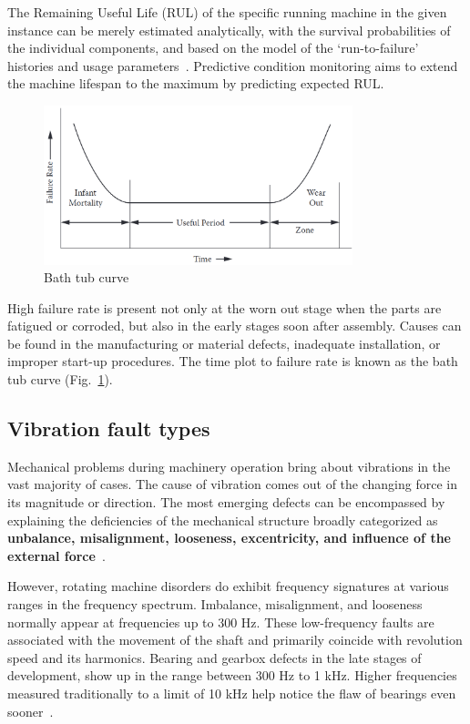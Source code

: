 The Remaining Useful Life (RUL) of the specific running machine in the given instance can be merely estimated analytically, with the survival probabilities of the individual components, and based on the model of the `run-to-failure' histories and usage parameters~\cite{okoh_overview_2014}. Predictive condition monitoring aims to extend the machine lifespan to the maximum by predicting expected RUL.

\begin{figure}[h]
	\centering
	\includegraphics[width=0.8\textwidth]{assets/bath-tub-curve.png}
	\caption{Bath tub curve~\cite{mohanty_machinery_2015}}
	\label{fig:bath-tub-curve}
\end{figure}

High failure rate is present not only at the worn out stage when the parts are fatigued or corroded, but also in the early stages soon after assembly. Causes can be found in the manufacturing or material defects, inadequate installation, or improper start-up procedures. The time plot to failure rate is known as the bath tub curve (Fig.~\ref{fig:bath-tub-curve}).

\subsection{Vibration fault types}
Mechanical problems during machinery operation bring about vibrations in the vast majority of cases. The cause of vibration comes out of the changing force in its magnitude or direction. The most emerging defects can be encompassed by explaining the deficiencies of the mechanical structure broadly categorized as \textbf{unbalance, misalignment, looseness, excentricity, and influence of the external force}~\cite{davies_handbook_2012}. 

However, rotating machine disorders do exhibit frequency signatures at various ranges in the frequency spectrum. Imbalance, misalignment, and looseness normally appear at frequencies up to 300 Hz. These low-frequency faults are associated with the movement of the shaft and primarily coincide with revolution speed and its harmonics. Bearing and gearbox defects in the late stages of development, show up in the range between 300 Hz to 1 kHz. Higher frequencies measured traditionally to a limit of 10 kHz help notice the flaw of bearings even sooner~\cite{torres_automatic_2022}.


